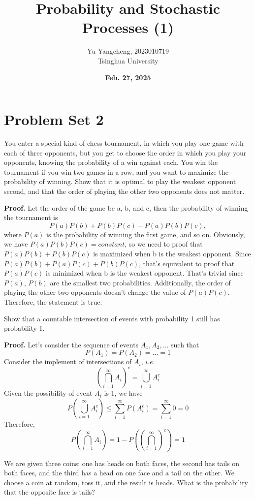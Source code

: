\documentclass{article}
\title{Probability and Stochastic Processes (1) }
\author{Yu Yangcheng, 2023010719\\ Tsinghua University}
\date{\textbf{Feb. 27, 2025}}
\begin{document}
\maketitle

\section*{Problem Set 2}


\begin{question}
You enter a special kind of chess tournament, in which you play one game with each of three opponents, but you get to choose the order in which you play your opponents, knowing the probability of a win against each. You win the tournament if you win two games in a row, and you want to maximize the probability of winning. Show that it is optimal to play the weakest opponent second, and that the order of playing the other two opponents does not matter.
\end{question}

    \textbf{Proof.}    
    Let the order of the game be a, b, and c, then the probability of winning the tournament is $$ P(a)P(b)+P(b)P(c)-P(a)P(b)P(c) ,$$
    where \( P(a) \) is the probability of winning the first game, and so on. Obviously, we have $P(a)P(b)P(c)=constant$, so we need to proof that \( P(a)P(b) +P(b)P(c) \) is maximized when b is the weakest opponent. Since \(P(a)P(b)+P(a)P(c)+P(b)P(c)\), that's equivalent to proof that \( P(a)P(c) \) is minimized when b is the weakest opponent. That's trivial since $P(a)$, $P(b)$ are the smallest two probabilities. Additionally, the order of playing the other two opponents doesn't change the value of $P(a)P(c)$. Therefore, the statement is true.


\begin{question}
Show that a countable intersection of events with probability 1 still has probability 1.
\end{question}

    \textbf{Proof.}
    Let's consider the sequence of events $A_1,A_2,\dots $ such that 
    $$ P(A_1)=P(A_2)=\dots=1 $$
    Consider the implement of intersections of $A_i$, $i.e.$
    $$ (\bigcap_{i=1}^{\infty} A_i)^c=\bigcup _{i=1}^{\infty}A_i^c $$
    Given the possibility of event $A_i$ is 1, we have 
    $$ P(\bigcup _{i=1}^{\infty}A_i^c)\leq \sum_{i=1}^{\infty}P(A_i^c)=\sum_{i=1}^{\infty}0=0 $$
    Therefore, 
    $$ P(\bigcap_{i=1}^{\infty} A_i)=1-P((\bigcap_{i=1}^{\infty})^c)=1 $$

\begin{question}
We are given three coins: one has heads on both faces, the second has tails on both faces, and the third has a head on one face and a tail on the other. We choose a coin at random, toss it, and the result is heads. What is the probability that the opposite face is tails?
\end{question}
\end{document}
